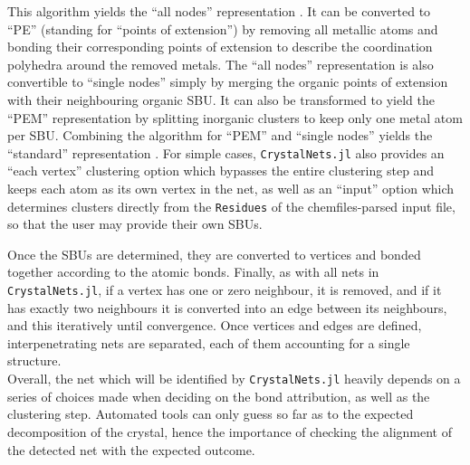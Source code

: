 \documentclass[main.tex]{subfiles}
\begin{document}
This algorithm yields the ``all nodes'' representation . It can be converted to ``PE'' (standing for ``points of extension'') by removing all metallic atoms and bonding their corresponding points of extension to describe the coordination polyhedra around the removed metals. The ``all nodes'' representation is also convertible to ``single nodes'' simply by merging the organic points of extension with their neighbouring organic SBU. It can also be transformed to yield the ``PEM'' representation by splitting inorganic clusters to keep only one metal atom per SBU. Combining the algorithm for ``PEM'' and ``single nodes'' yields the ``standard'' representation \autocite{BlatovSimplify}. For simple cases, \texttt{CrystalNets.jl} also provides an ``each vertex'' clustering option which bypasses the entire clustering step and keeps each atom as its own vertex in the net, as well as an ``input'' option which determines clusters directly from the \texttt{Residues} of the chemfiles-parsed input file, so that the user may provide their own SBUs.



Once the SBUs are determined, they are converted to vertices and bonded together according to the atomic bonds. %
Finally, as with all nets in \texttt{CrystalNets.jl}, if a vertex has one or zero neighbour, it is removed, and if it has exactly two neighbours it is converted into an edge between its neighbours, and this iteratively until convergence. Once vertices and edges are defined, interpenetrating nets are separated, each of them accounting for a single structure.\\

Overall, the net which will be identified by \texttt{CrystalNets.jl} heavily depends on a series of choices made when deciding on the bond attribution, as well as the clustering step. Automated tools can only guess so far as to the expected decomposition of the crystal, hence the importance of checking the alignment of the detected net with the expected outcome.
\end{document}

